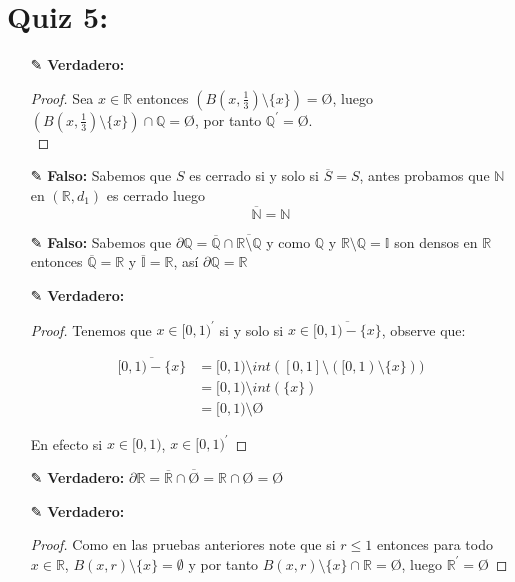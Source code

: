 \section{Quiz 5: }

\begin{itemize}
    \item[✎]\textbf{Verdadero: }\\
    \begin{proof}
        Sea $x \in \mathbb{R}$ entonces $(B(x,\frac{1}{3})\setminus \{x\})=\text{\O}$, luego $(B(x,\frac{1}{3})\setminus \{x\})\cap \mathbb{Q}=$\O, por tanto $\mathbb{Q}^{\prime}=$\O.\\ 
    \end{proof}


    \item[✎] \textbf{Falso: }Sabemos que $S$ es cerrado si y solo si $\overline{S}=S$, antes probamos que $\mathbb{N}$ en $(\mathbb{R},d_1)$ es cerrado luego $$\overline{\mathbb{N}}=\mathbb{N}$$


    \item[✎] \textbf{Falso: }Sabemos que $\partial \mathbb{Q}=$$\overline{\mathbb{Q}}\cap$$\overline{\mathbb{R}\setminus\mathbb{Q}}$ y como $\mathbb{Q}$ y $\mathbb{R}\setminus\mathbb{Q}=\mathbb{I}$ son densos en $\mathbb{R}$ entonces $\overline{\mathbb{Q}}=\mathbb{R}$ y $\overline{\mathbb{I}}=\mathbb{R}$, así $\partial \mathbb{Q}=\mathbb{R}$


    \item[✎] \textbf{Verdadero: }\\
    \begin{proof}
        Tenemos que $x \in [0,1)^{\prime}$ si y solo si $x \in \overline{[0,1)-\{x\}}$, observe que:
        
        \begin{align*}
            \overline{[0,1)-\{x\}}&=[0,1)\setminus int([0,1]\setminus ([0,1)\setminus \{x\}))\\
            &=[0,1)\setminus int(\{x\})\\
            &=[0,1)\setminus \text{\O}
        \end{align*}
        
        En efecto si $x\in [0,1)$, $x \in [0,1)^{\prime}$ 
    \end{proof}

    \item[✎]\textbf{Verdadero: }$\partial \mathbb{R}=$$\overline{\mathbb{R}}\cap$$\overline{\text{\O}}=\mathbb{R}\cap$\O$=$\O


    \item[✎]\textbf{Verdadero: } \\
    \begin{proof}
        Como en las pruebas anteriores note que si $r\leq1$ entonces para todo $x\in \mathbb{R}$, $B(x,r)\setminus\{x\}=$$\emptyset$ y por tanto $B(x,r)\setminus\{x\}\cap \mathbb{R}=$\O, luego $\mathbb{R}^{\prime}=$\O
    \end{proof}



\end{itemize}
